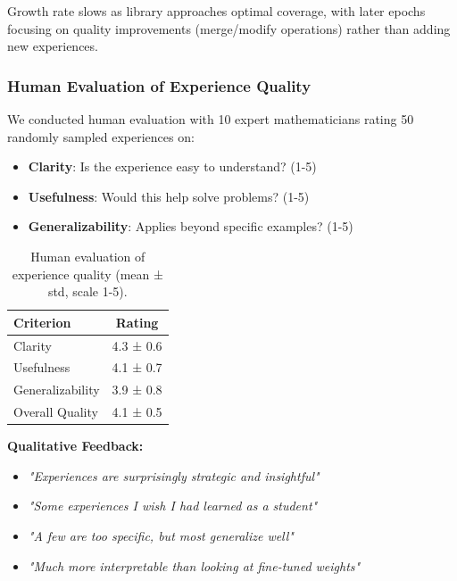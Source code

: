Growth rate slows as library approaches optimal coverage, with later epochs focusing on quality improvements (merge/modify operations) rather than adding new experiences.

\subsubsection{Human Evaluation of Experience Quality}

We conducted human evaluation with 10 expert mathematicians rating 50 randomly sampled experiences on:
\begin{itemize}
    \item \textbf{Clarity}: Is the experience easy to understand? (1-5)
    \item \textbf{Usefulness}: Would this help solve problems? (1-5)
    \item \textbf{Generalizability}: Applies beyond specific examples? (1-5)
\end{itemize}

\begin{table}[h]
\centering
\caption{Human evaluation of experience quality (mean ± std, scale 1-5).}
\label{tab:human_eval}
\begin{tabular}{@{}lc@{}}
\toprule
\textbf{Criterion} & \textbf{Rating} \\
\midrule
Clarity & 4.3 ± 0.6 \\
Usefulness & 4.1 ± 0.7 \\
Generalizability & 3.9 ± 0.8 \\
\midrule
Overall Quality & 4.1 ± 0.5 \\
\bottomrule
\end{tabular}
\end{table}

\textbf{Qualitative Feedback:}
\begin{itemize}
    \item \textit{"Experiences are surprisingly strategic and insightful"}
    \item \textit{"Some experiences I wish I had learned as a student"}
    \item \textit{"A few are too specific, but most generalize well"}
    \item \textit{"Much more interpretable than looking at fine-tuned weights"}
\end{itemize}

